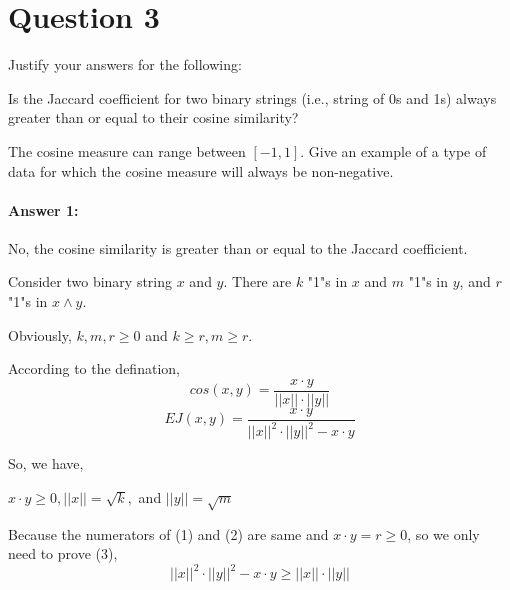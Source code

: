 \documentclass{article}
\begin{document}
\section*{Question 3}{
    Justify your answers for the following:

    \begin{enumerate}{
        \item Is the Jaccard coefficient for two binary strings (i.e., string of 0s and 1s) always greater than or equal to their cosine similarity? 
        \item The cosine measure can range between $[-1,1]$. Give an example of a type of data for which the cosine measure will always be non-negative.
    }
    \end{enumerate}

    \paragraph{Answer 1: }{
        No, the cosine similarity is greater than or equal to the Jaccard coefficient.

        Consider two binary string $x$ and $y$. There are $k$ "1"s in $x$ and $m$ "1"s in $y$, and $r$ "1"s in \(x\wedge y\). 

        Obviously, \(k, m, r \geqslant 0\) and \(k\geqslant r, m\geqslant r\).

        According to the defination, 
        \begin{equation}
            cos(x,y) = \frac{x\cdot y}{\lvert\lvert x\rvert\rvert \cdot \lvert\lvert y\rvert\rvert}
        \end{equation}
        \begin{equation}
            \mathit{EJ}(x,y) = \frac{x\cdot y}{\lvert\lvert x\rvert\rvert^{2} \cdot \lvert\lvert y\rvert\rvert^{2} - x\cdot y}
        \end{equation}

        So, we have,
        \begin{center}{
            \(x\cdot y \geqslant 0, \lvert\lvert x\rvert\rvert = \sqrt{k},\) and \(\lvert\lvert y\rvert\rvert = \sqrt{m}\)
        }
        \end{center}

        Because the numerators of (1) and (2) are same and \(x\cdot y = r \geqslant 0\), so we only need to prove (3),
        \begin{equation}
             \lvert\lvert x\rvert\rvert^{2} \cdot \lvert\lvert y\rvert\rvert^{2} - x\cdot y \geqslant \lvert\lvert x\rvert\rvert \cdot \lvert\lvert y\rvert\rvert
        \end{equation}

}}
\end{document}
